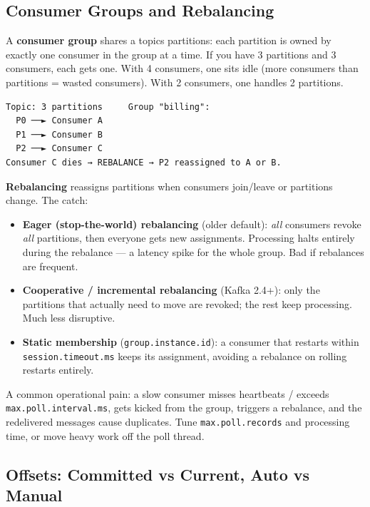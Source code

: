 \documentclass[11pt]{article}
\providecommand{\tightlist}{\setlength{\itemsep}{1pt}\setlength{\parskip}{0pt}}
\begin{document}
\subsection{Consumer Groups and Rebalancing}\label{consumer-groups-and-rebalancing}

A \textbf{consumer group} shares a topic\textquotesingle s partitions: each partition is owned by exactly one consumer in the group at a time. If you have 3 partitions and 3 consumers, each gets one. With 4 consumers, one sits idle (more consumers than partitions = wasted consumers). With 2 consumers, one handles 2 partitions.

\setcodelang{}

\begin{verbatim}
Topic: 3 partitions     Group "billing":
  P0 ──► Consumer A
  P1 ──► Consumer B
  P2 ──► Consumer C
Consumer C dies → REBALANCE → P2 reassigned to A or B.
\end{verbatim}

\textbf{Rebalancing} reassigns partitions when consumers join/leave or partitions change. The catch:

\begin{itemize}
\tightlist
\item
  \textbf{Eager (stop-the-world) rebalancing} (older default): \emph{all} consumers revoke \emph{all} partitions, then everyone gets new assignments. Processing halts entirely during the rebalance --- a latency spike for the whole group. Bad if rebalances are frequent.
\item
  \textbf{Cooperative / incremental rebalancing} (Kafka 2.4+): only the partitions that actually need to move are revoked; the rest keep processing. Much less disruptive.
\item
  \textbf{Static membership} (\texttt{group.instance.id}): a consumer that restarts within \texttt{session.timeout.ms} keeps its assignment, avoiding a rebalance on rolling restarts entirely.
\end{itemize}

A common operational pain: a slow consumer misses heartbeats / exceeds \texttt{max.poll.interval.ms}, gets kicked from the group, triggers a rebalance, and the redelivered messages cause duplicates. Tune \texttt{max.poll.records} and processing time, or move heavy work off the poll thread.

\subsection{Offsets: Committed vs Current, Auto vs Manual}\label{offsets-committed-vs-current-auto-vs-manual}
\end{document}
